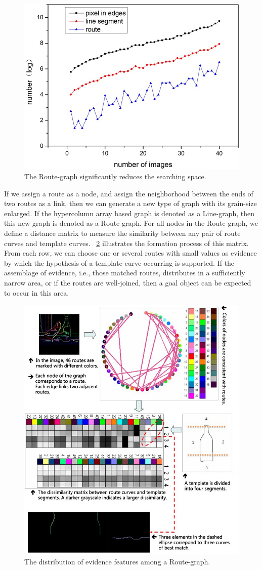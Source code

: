 \documentclass[journal]{IEEEtran}
\begin{document}
\begin{figure}[!t]
\centering
\includegraphics[width=0.6\linewidth]{images/fig14.jpg}
\caption{The Route-graph significantly reduces the searching space.}
\label{fig:14}
\end{figure}

If we assign a route as a node, and assign the neighborhood between the ends of two routes as a link, 
then we can generate a new type of graph with its grain-size enlarged. 
If the hypercolumn array based graph is denoted as a Line-graph, then this new graph is denoted as a Route-graph. 
For all nodes in the Route-graph, we define a distance matrix to measure the similarity between any pair of route curves and template curves. 
\figurename~\ref{fig:15} illustrates the formation process of this matrix. 
From each row, we can choose one or several routes with small values as evidence by which the hypothesis of a template curve occurring is supported. 
If the assemblage of evidence, i.e., those matched routes, distributes in a sufficiently narrow area, 
or if the routes are well-joined, then a goal object can be expected to occur in this area.

\begin{figure}[!t]
\centering
\includegraphics[width=0.9\linewidth]{images/fig15.jpg}
\caption{The distribution of evidence features among a Route-graph.}
\label{fig:15}
\end{figure}
\end{document}
